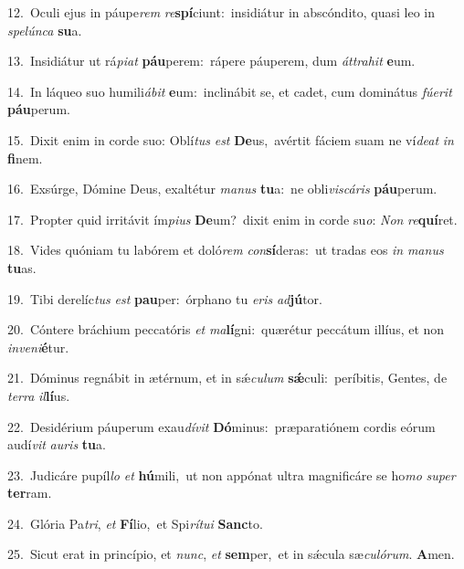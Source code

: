{\numbfont\textcolor{\numbcolor}{12.}}~Oculi ejus in páupe\textit{rem} \textit{re}\-\textbf{spí}ciunt:~\star insidiátur in abscóndito, quasi leo in \textit{spe}\-\textit{lún}\textit{ca} \textbf{su}\-a.\par
{\numbfont\textcolor{\numbcolor}{13.}}~Insidiátur ut rá\-\textit{pi}\-\textit{at} \textbf{páu}\-perem:~\star rápere páuperem, dum \textit{át}\-\textit{tra}\textit{hit} \textbf{e}\-um.\par
{\numbfont\textcolor{\numbcolor}{14.}}~In láqueo suo humili\-\textit{á}\-\textit{bit} \textbf{e}\-um:~\star inclinábit se, et cadet, cum dominátus \textit{fú}\-\textit{e}\textit{rit} \textbf{páu}\-perum.\par
{\numbfont\textcolor{\numbcolor}{15.}}~Dixit enim in corde suo: Oblí\textit{tus} \textit{est} \textbf{De}\-us,~\star avértit fáciem suam ne ví\-\textit{de}\-\textit{at} \textit{in} \textbf{fi}\-nem.\par
{\numbfont\textcolor{\numbcolor}{16.}}~Exsúrge, Dómine Deus, exaltétur \textit{ma}\-\textit{nus} \textbf{tu}\-a:~\star ne obli\-\textit{vis}\-\textit{cá}\textit{ris} \textbf{páu}\-perum.\par
{\numbfont\textcolor{\numbcolor}{17.}}~Propter quid irritávit ím\-\textit{pi}\-\textit{us} \textbf{De}\-um?~\star dixit enim in corde su\-\textit{o}\-: \textit{Non} \textit{re}\-\textbf{quí}ret.\par
{\numbfont\textcolor{\numbcolor}{18.}}~Vides quóniam tu labórem et doló\textit{rem} \textit{con}\-\textbf{sí}deras:~\star ut tradas eos \textit{in} \textit{ma}\-\textit{nus} \textbf{tu}\-as.\par
{\numbfont\textcolor{\numbcolor}{19.}}~Tibi derelíc\textit{tus} \textit{est} \textbf{pau}\-per:~\star órphano tu \textit{e}\-\textit{ris} \textit{ad}\-\textbf{jú}tor.\par
{\numbfont\textcolor{\numbcolor}{20.}}~Cóntere bráchium peccatóris \textit{et} \textit{ma}\-\textbf{lí}gni:~\star quærétur peccátum illíus, et non \textit{in}\-\textit{ve}\textit{ni}\textbf{é}tur.\par
{\numbfont\textcolor{\numbcolor}{21.}}~Dóminus regnábit in ætérnum, et in sǽ\-\textit{cu}\-\textit{lum} \textbf{sǽ}\-culi:~\star períbitis, Gentes, de \textit{ter}\-\textit{ra} \textit{il}\-\textbf{lí}us.\par
{\numbfont\textcolor{\numbcolor}{22.}}~Desidérium páuperum exau\-\textit{dí}\-\textit{vit} \textbf{Dó}\-minus:~\star præparatiónem cordis eórum audí\textit{vit} \textit{au}\-\textit{ris} \textbf{tu}\-a.\par
{\numbfont\textcolor{\numbcolor}{23.}}~Judicáre pupíl\textit{lo} \textit{et} \textbf{hú}\-mili,~\star ut non appónat ultra magnificáre se ho\textit{mo} \textit{su}\-\textit{per} \textbf{ter}\-ram.\par
{\numbfont\textcolor{\numbcolor}{24.}}~Glória Pa\-\textit{tri}\-, \textit{et} \textbf{Fí}\-lio,~\star et Spi\-\textit{rí}\-\textit{tu}\textit{i} \textbf{Sanc}\-to.\par
{\numbfont\textcolor{\numbcolor}{25.}}~Sicut erat in princípio, et \textit{nunc}\-, \textit{et} \textbf{sem}\-per,~\star et in sǽcula sæ\-\textit{cu}\-\textit{ló}\textit{rum}. \textbf{A}\-men.\par
